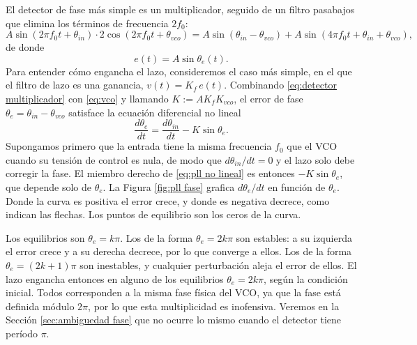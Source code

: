 El detector de fase más simple es un multiplicador, seguido de un filtro pasabajos que elimina los términos de frecuencia $2f_0$:
\begin{equation*}
    A\sin(2\pi f_0 t+\theta_{in})\cdot 2\cos(2\pi f_0 t+\theta_{vco}) = A\sin(\theta_{in}-\theta_{vco}) + A\sin(4\pi f_0 t+\theta_{in}+\theta_{vco}),
\end{equation*}
de donde
\begin{equation}\label{eq:detector multiplicador}
    e(t) = A\sin\theta_e(t).
\end{equation}
Para entender cómo engancha el lazo, consideremos el caso más simple, en el que el filtro de lazo es una ganancia, $v(t)=K_f\,e(t)$. Combinando \eqref{eq:detector multiplicador} con \eqref{eq:vco} y llamando $K:=AK_fK_{vco}$, el error de fase $\theta_e=\theta_{in}-\theta_{vco}$ satisface la ecuación diferencial no lineal
\begin{equation}\label{eq:pll no lineal}
    \frac{d\theta_e}{dt} = \frac{d\theta_{in}}{dt} - K\sin\theta_e.
\end{equation}
Supongamos primero que la entrada tiene la misma frecuencia $f_0$ que el VCO cuando su tensión de control es nula, de modo que $d\theta_{in}/dt=0$ y el lazo solo debe corregir la fase. El miembro derecho de \eqref{eq:pll no lineal} es entonces $-K\sin\theta_e$, que depende solo de $\theta_e$. La Figura \ref{fig:pll fase} grafica $d\theta_e/dt$ en función de $\theta_e$. Donde la curva es positiva el error crece, y donde es negativa decrece, como indican las flechas. Los puntos de equilibrio son los ceros de la curva.

Los equilibrios son $\theta_e=k\pi$. Los de la forma $\theta_e=2k\pi$ son estables: a su izquierda el error crece y a su derecha decrece, por lo que converge a ellos. Los de la forma $\theta_e=(2k+1)\pi$ son inestables, y cualquier perturbación aleja el error de ellos. El lazo engancha entonces en alguno de los equilibrios $\theta_e=2k\pi$, según la condición inicial. Todos corresponden a la misma fase física del VCO, ya que la fase está definida módulo $2\pi$, por lo que esta multiplicidad es inofensiva. Veremos en la Sección \ref{sec:ambiguedad fase} que no ocurre lo mismo cuando el detector tiene período $\pi$.

